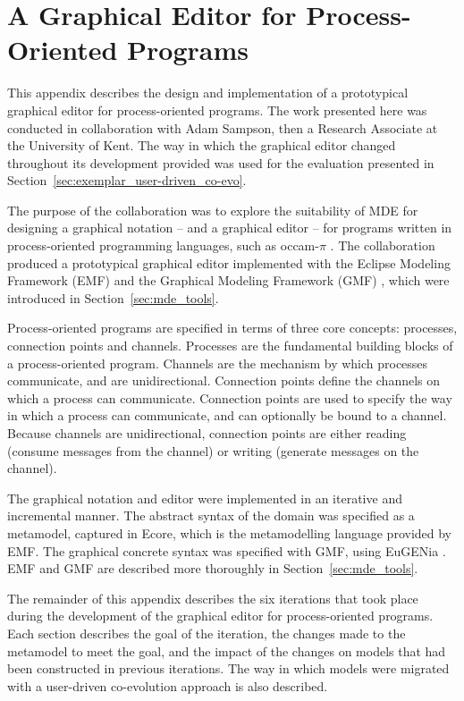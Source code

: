 
\chapter[A Graphical Editor for Process-Oriented Programs][An Exemplar Graphical Model Editor]{A Graphical Editor for Process-Oriented Programs}
\label{ProcessOriented}

This appendix describes the design and implementation of a prototypical graphical editor for process-oriented programs. The work presented here was conducted in collaboration with Adam Sampson, then a Research Associate at the University of Kent. The way in which the graphical editor changed throughout its development provided was used for the evaluation presented in Section~\ref{sec:exemplar_user-driven_co-evo}.

The purpose of the collaboration was to explore the suitability of MDE  for designing a graphical notation -- and a graphical editor -- for programs written in process-oriented programming languages, such as occam-$\pi$ \cite{occam_pi}. The collaboration produced a prototypical graphical editor implemented with the Eclipse Modeling Framework (EMF) \cite{steinberg09emf} and the Graphical Modeling Framework (GMF) \cite{gronback09emp}, which were introduced in Section~\ref{sec:mde_tools}.

Process-oriented programs are specified in terms of three core concepts: processes, connection points and channels. Processes are the fundamental building blocks of a process-oriented program. Channels are the mechanism by which processes communicate, and are unidirectional. Connection points define the channels on which a process can communicate. Connection points are used to specify the way in which a process can communicate, and can optionally be bound to a channel. Because channels are unidirectional, connection points are either reading (consume messages from the channel) or writing (generate messages on the channel).

The graphical notation and editor were implemented in an iterative and incremental manner. The abstract syntax of the domain was specified as a metamodel, captured in Ecore, which is the metamodelling language provided by EMF. The graphical concrete syntax was specified with GMF, using EuGENia \cite{kolovos10eugenia}. EMF and GMF are described more thoroughly in Section~\ref{sec:mde_tools}.

The remainder of this appendix describes the six iterations that took place during the development of the graphical editor for process-oriented programs. Each section describes the goal of the iteration, the changes made to the metamodel to meet the goal, and the impact of the changes on models that had been constructed in previous iterations. The way in which models were migrated with a user-driven co-evolution approach is also described.

